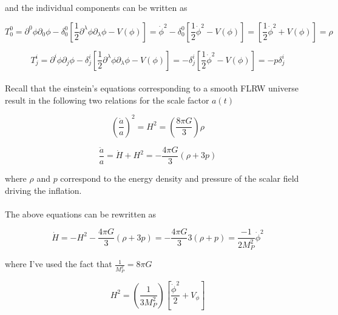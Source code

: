 \documentclass[12pt,a4paper,oneside]{book}
\begin{document}
\noindent and the individual components can be written as

\begin{equation}
T^{0}_{0} = \partial^{0}\phi \partial_{0}\phi -\delta^{0}_{0}[\frac{1}{2}\partial^{\lambda}\phi \partial_{\lambda}\phi - V(\phi)] = \dot{\phi}^2 -\delta^{0}_{0}[\frac{1}{2}\dot{\phi}^2 - V(\phi)]
 = [\frac{1}{2}\dot{\phi}^2 +V(\phi)] = \rho 
\end{equation}

\begin{equation}
T^{i}_{j} = \partial^{i}\phi \partial_{j}\phi -\delta^{i}_{j}[\frac{1}{2}\partial^{\lambda}\phi \partial_{\lambda}\phi - V(\phi)]
 = -\delta^{i}_{j}[\frac{1}{2}\dot{\phi}^2 - V(\phi)] = -p\delta^i_j
\end{equation}

\paragraph*{} Recall that the einstein's equations corresponding to a smooth FLRW universe result in the following two relations for the scale factor $a(t)$

\begin{equation}
(\frac{\dot{a}}{a})^2 = H^2 = (\frac{8\pi G}{3})\rho
\end{equation}

\begin{equation}
\frac{\ddot{a}}{a} = \dot{H} + H^2= -\frac{4\pi G}{3}(\rho + 3p)
\end{equation}

\noindent where $\rho$ and $p$ correspond to the energy density and pressure of the scalar field driving the inflation.

\paragraph*{} The above equations can be rewritten as

\begin{equation}
 \dot{H} = -H^2 -\frac{4\pi G}{3}(\rho + 3p) = -\frac{4\pi G}{3}3(\rho + p)
= \frac{-1}{2M_P^2}\dot{\phi}^2
\end{equation}

\noindent where I've used the fact that $\frac{1}{M_P^2} = 8\pi G$

\begin{equation}
H^2 = (\frac{1}{3M_P^2})[\frac{\dot{\phi}^2}{2} + V_{\phi}]
\end{equation}
\end{document}
